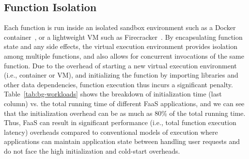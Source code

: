 






%
%

\subsection{Function Isolation}

Each function is run inside an isolated sandbox environment such as a Docker container~\cite{docker-main}, or a lightweight VM such as Firecracker~\cite{firecracker-nsdi20}. 
By encapsulating function state and any side effects, the virtual execution environment provides isolation among multiple functions, and also allows for concurrent invocations of the same function. 
Due to the overhead of starting a new virtual execution environment (i.e., container or VM), and initializing the function by importing libraries and other data dependencies, function execution thus incurs a significant  penalty.
Table~\ref{tab:bg-workloads} shows the breakdown of initialization time (last column) vs. the total running time of different FaaS applications, and we can see that the initialization overhead can be as much as 80\% of the total running time. 
Thus, FaaS can result in significant performance (i.e., total function execution latency) overheads compared to conventional models of execution where applications can maintain application state between handling user requests and do not face the high initialization and cold-start overheads.



